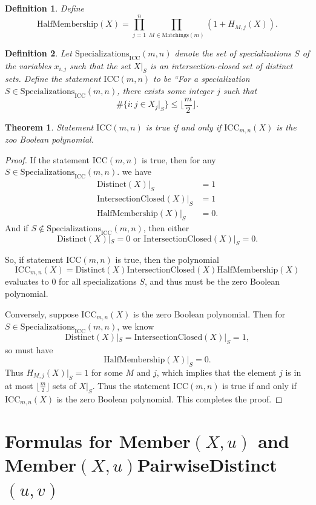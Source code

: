 \documentclass[10pt,a4paper]{amsart}
\newtheorem{theorem}{Theorem}
\newtheorem{definition}{Definition}
\begin{document}
\begin{definition} 
Define $$\mathrm{HalfMembership}(X) = \prod_{j=1}^n \prod_{M \in \mathrm{Matchings}(m)} (1+H_{M,j}(X)).$$
\end{definition}

\begin{definition} 
Let $\mathrm{Specializations}_{\mathrm{ICC}}(m,n)$ denote the set of specializations $S$ of the variables $x_{i,j}$ such that the set $X|_S$ is an intersection-closed set of distinct sets. Define the statement $\mathrm{ICC}(m,n)$ to be ``For a specialization $S \in \mathrm{Specializations}_{\mathrm{ICC}}(m,n)$, there exists some integer $j$ such that 
\[
\#\{ i \colon j \in X_j|_S \} \leq \lfloor \frac{m}{2}\rfloor.  
\]
\end{definition}


\begin{theorem} 
Statement $\mathrm{ICC}(m,n)$ is true if and only if $\mathrm{ICC}_{m,n}(X)$ is the zoo Boolean polynomial. 
\end{theorem}

\begin{proof}
If the statement ICC$(m,n)$ is true, then for any $S \in \mathrm{Specializations}_{\mathrm{ICC}}(m,n)$. 
we have
$$
\begin{aligned} 
\mathrm{Distinct}(X)|_S&=1\\ 
\mathrm{IntersectionClosed}(X)|_S&=1 \\
\mathrm{HalfMembership}(X)|_S&=0.
\end{aligned}
$$
And if $S \notin \mathrm{Specializations}_{\mathrm{ICC}}(m,n)$, then either 
$$
\mathrm{Distinct}(X)|_S=0 \text{ or } \mathrm{IntersectionClosed}(X)|_S=0. 
$$

So, if statement ICC$(m,n)$ is true, then the polynomial
$$ \label{7}
\mathrm{ICC}_{m,n}(X) = \mathrm{Distinct}(X)
\mathrm{IntersectionClosed}(X)
\mathrm{HalfMembership}(X)
$$
evaluates to 0 for all specializations $S$, and thus must be the zero Boolean polynomial. 

Conversely, suppose $\mathrm{ICC}_{m,n}(X)$ is the zero Boolean polynomial. Then for $S \in \mathrm{Specializations}_{\mathrm{ICC}}(m,n)$, we know 
$$ \mathrm{Distinct}(X)|_S = 
\mathrm{IntersectionClosed}(X)|_S = 1,
$$ so must have 
$$\mathrm{HalfMembership}(X)|_S=0.$$ Thus $H_{M,j}(X)|_S=1$ for some $M$ and $j$, which implies that the element $j$ is in at most $\lfloor \frac{m}{2} \rfloor$ sets of $X|_S$. Thus the statement ICC$(m,n)$ is true if and only if $\mathrm{ICC}_{m,n}(X)$ is the zero Boolean polynomial. This completes the proof.
\end{proof}

\section{Formulas for Member$(X,u)$ and  \newline Member$(X,u)$PairwiseDistinct$(u,v)$}
\end{document}
